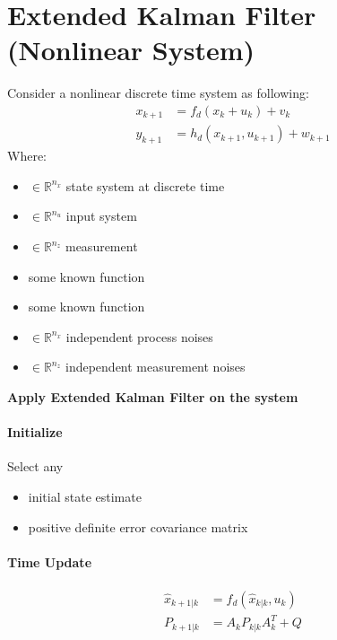 	\section{Extended Kalman Filter (Nonlinear System)}
	Consider a nonlinear discrete time system as following:
	\begin{equation}
		\begin{split}
			x_{k+1} &= f_d(x_k+u_k) + v_k \\
			y_{k+1} &= h_d(x_{k+1},u_{k+1}) + w_{k+1}
		\end{split}
		\label{kfeq5}
	\end{equation}
	Where:
	\begin{itemize}
		\item { \(\in \mathbb{R}^{n_x}\) state system at discrete time}
		\item { \(\in \mathbb{R}^{n_u}\) input system}
		\item { \(\in \mathbb{R}^{n_z}\) measurement}
		\item { some known function}
		\item { some known function}
		\item { \(\in \mathbb{R}^{n_x}\) independent process noises}
		\item { \(\in \mathbb{R}^{n_z}\) independent measurement noises}
	\end{itemize}
	\begin{center}
		\textbf{Apply Extended Kalman Filter on the system}
	\end{center}
	\paragraph{Initialize} Select any
	\begin{itemize}
		\item { initial state estimate}
		\item { positive definite error covariance matrix}
	\end{itemize}
	\paragraph{Time Update}
	\begin{equation}
		\begin{split}
			\hat{x}_{k+1|k} &= f_d(\hat{x}_{k|k},u_k) \\
			P_{k+1|k} &= A_kP_{k|k}A^T_k+Q
		\end{split}
		\label{kfeq6}
	\end{equation}
